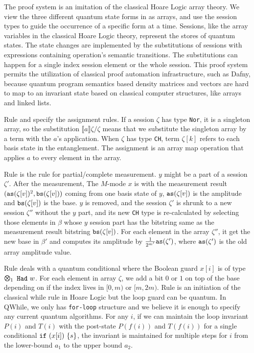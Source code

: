 The proof system is an imitation of the classical Hoare Logic array theory.
We view the three different quantum state forms in  as arrays,
and use the session types to guide the occurrence of a specific form at a time.
Sessions, like the array variables in the classical Hoare Logic theory,
represent the stores of quantum states.
The state changes are implemented by the substitutions of sessions
with expressions containing operation's semantic transitions.
The substitutions can happen for a single index session element or the whole session.
This proof system permits the utilization of classical proof automation infrastructure, such as Dafny,
because quantum program semantics based density matrices and vectors
are hard to map to an invariant state based on classical computer structures,
like arrays and linked lists.

Rule  and  specify the assignment rules.
If a session $\zeta$ has type \texttt{Nor}, it is a singleton array,
so the substitution $\llbracket a \rrbracket \zeta /\zeta$ means
that we substitute the singleton array by a term with the $a$'s application.
When $\zeta$ has type \texttt{CH}, term $\zeta[k]$ refers to each basis state in the entanglement.
The assignment is an array map operation that applies $a$ to every element in the array.

Rule  is the rule for partial/complete measurement.
$y$ might be a part of a session $\zeta'$. After the measurement,
The $M$-mode $x$ is with the measurement result $(\texttt{as}(\zeta[v])^2,\texttt{bs}(\zeta[v]))$ coming
from one basis state of $y$, $\texttt{as}(\zeta[v])$ is the amplitude and $\texttt{bs}(\zeta[v])$ is the base.
$y$ is removed, and the session $\zeta'$ is shrunk to a new session $\zeta''$ without the $y$ part, and
its new \texttt{CH} type is re-calculated by selecting those elements
in $\beta$ whose $y$ session part has the bitstring same as the measurement result bitstring $\texttt{bs}(\zeta[v])$.
For each element in the array $\zeta''$, it get the new base in $\beta'$ 
and computes its amplitude by $\frac{1}{2^{m'}}\texttt{as}(\zeta')$, where $\texttt{as}(\zeta')$ is the old array amplitude value.

Rule  deals with a quantum conditional where the Boolean guard $x[i]$ is of type $\ttype{1}{\thad{w}}$.
For each element in array $\zeta$, we add a bit $0$ or $1$ on
top of the base depending on if the index lives in $[0,m)$ or $[m,2m)$.
Rule  is an initiation of the classical while rule in Hoare Logic but the loop guard can be quantum.
In QWhile, we only has \texttt{for-loop} structure and we believe it is enough to specify any current quantum algorithms.
For any $i$, if we can maintain the loop invariant $P(i)$ and $T(i)$ with the post-state $P(f(i))$ and $T(f(i))$
for a single conditional $\texttt{if}~{(x[i])}~{\{s\}}$, the invariant is maintained for multiple steps
for $i$ from the lower-bound $a_1$ to the upper bound $a_2$.

